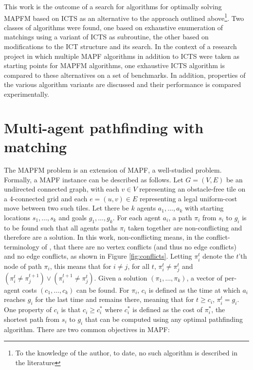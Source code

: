 \documentclass[english,10pt]{article}
\begin{document}
	This work is the outcome of a search for algorithms for optimally solving MAPFM based on ICTS as an alternative to the approach outlined above\footnote{To the knowledge of the author, to date, no such algorithm is described in the literature}. Two classes of algorithms were found, one based on exhaustive enumeration of matchings using a variant of ICTS as subroutine, the other based on modifications to the ICT structure and its search. In the context of a research project in which multiple MAPF algorithms in addition to ICTS were taken as starting points for MAPFM algorithms, one exhaustive ICTS algorithm is compared to these alternatives on a set of benchmarks. In addition, properties of the various algorithm variants are discussed and their performance is compared experimentally.
	
	\section{Multi-agent pathfinding with matching} %
	\label{mapfm}
	The MAPFM problem is an extension of MAPF, a well-studied problem. Formally, a MAPF instance can be described as follows. Let $G = (V,E)$ be an undirected connected graph, with each $v\in V$ representing an obstacle-free tile on a 4-connected grid and each $e = (u,v)\in E$ representing a legal uniform-cost move between two such tiles. Let there be $k$ agents $a_1,\ldots,a_k$ with starting locations $s_1,\ldots,s_k$ and goals $g_1,\ldots,g_k$. For each agent $a_i$, a path $\pi_i$ from $s_i$ to $g_i$ is to be found such that all agents paths $\pi_i$ taken together are non-conflicting and therefore are a solution. In this work, non-conflicting means, in the conflict-terminology of \cite{stern2019}, that there are no vertex conflicts (and thus no edge conflicts) and no edge conflicts, as shown in Figure \ref{fig:conflicts}. Letting $\pi_i^t$ denote the $t$'th node of path $\pi_i$, this means that for $i\neq j$, for all $t$, $\pi_i^t\neq \pi_j^t$ and $(\pi_i^t \neq \pi_j^{t + 1})\lor(\pi_i^{t+1} \neq \pi_j^t)$. Given a solution $(\pi_1,\ldots,\pi_k)$, a vector of per-agent costs $(c_1,\ldots,c_k)$ can be found. For $\pi_i$, $c_i$ is defined as the time at which $a_i$ reaches $g_i$ for the last time and remains there, meaning that for $t \geq c_i$, $\pi_i^{t} = g_i$. One property of $c_i$ is that $c_i \geq c^*_i$ where $c^*_i$ is defined as the cost of $\pi^*_i$, the shortest path from $s_i$ to $g_i$ that can be computed using any optimal pathfinding algorithm. There are two common objectives in MAPF:
\end{document}
